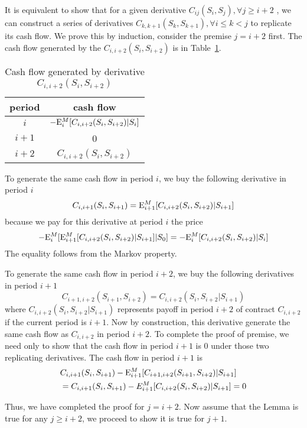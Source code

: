 \proof
It is equivalent to show that for a given derivative $C_{ij}(S_i,S_j), \forall j \geq i+2$ , we can construct  a series of derivatives $C_{k,k+1}(S_k,S_{k+1}), \forall i \leq k<j$ to replicate its cash flow. We prove this by induction, consider the premise  $j=i+2$ first. The cash flow generated by the $C_{i,i+2}(S_i,S_{i+2})$ is in Table~\ref{tbl:cftwoperiods}. 
\begin{table}[htdp]
\caption{Cash flow generated by derivative $C_{i,i+2}(S_i,S_{i+2})$}
\begin{center}
\begin{tabular}{|c|c|}
\hline
period & cash flow \\ \hline
 $i$ & $-\mathrm{E}_i^M[C_{i,i+2}(S_i,S_{i+2})|S_i]$ \\ \hline
$i+1$ & 0 \\ \hline
 $i+2$ & $C_{i,i+2}(S_i,S_{i+2})$ \\ \hline
\end{tabular}
\end{center}
\label{tbl:cftwoperiods}
\end{table}%
To generate the same cash flow in period $i$, we buy the following derivative in period $i$
\[C_{i,i+1} (S_i, S_{i+1}) = \mathrm{E}_{i+1}^M[C_{i,i+2}(S_i,S_{i+2})|S_{i+1}] \]
because we pay for this derivative at period $i$ the price
\[ -\mathrm{E}_i^M[\mathrm{E}_{i+1}^M[C_{i,i+2}(S_i,S_{i+2})|S_{i+1}]|S_0] =- \mathrm{E}_i^M[C_{i,i+2}(S_i,S_{i+2})|S_i] \] 
The equality follows from the Markov property.

To generate the same cash flow in period $i+2$, we buy the following derivatives in period $i+1$  
\[C_{i+1,i+2}(S_{i+1},S_{i+2}) = C_{i,i+2}(S_{i},S_{i+2}|S_{i+1}) \]
where $C_{i,i+2}(S_{i},S_{i+2}|S_{i+1})$ represents payoff in period $i+2$ of contract $C_{i,i+2}$ if the current period is $i+1$. Now by construction, this derivative generate the same cash flow as $C_{i,i+2}$ in period $i+2$. To complete the proof of premise, we need only to show that the cash flow in period $i+1$ is 0 under those two replicating derivatives. The cash flow in period $i+1$ is
\begin{align*}
& C_{i,i+1}(S_i,S_{i+1}) - \mathrm{E}_{i+1}^M[C_{i+1,i+2}(S_{i+1},S_{i+2}) |S_{i+1}] \\ &
=C_{i,i+1}(S_i,S_{i+1})- E_{i+1}^M[C_{i,i+2}(S_i,S_{i+2})|S_{i+1}] =0 
\end{align*}
 
 Thus, we have completed the proof for $j = i+2$. Now assume that the Lemma is true for any $j  \geq i + 2$, we proceed to show it is true for $j+1$. 
 
